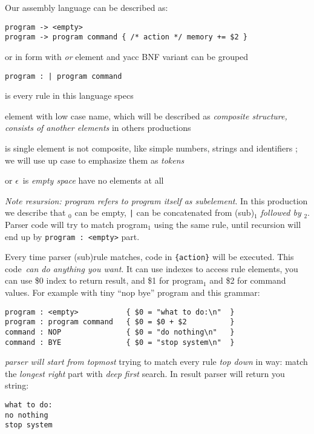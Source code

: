 \bigskip\noindent
Our assembly language can be described as:
\begin{lstlisting}
program -> <empty>
program -> program command { /* action */ memory += $2 }
\end{lstlisting}
or in form with \emph{or} element and yacc BNF variant can be grouped
\begin{lstlisting}
program : | program command
\end{lstlisting}

\begin{description}[nosep]
\item[\term{production}] is every rule in this language specs
\item[\term{nonterminal}] element with low case name, which will be
described as \emph{composite structure, consists of another elements} in others
productions
\item[\term{terminal}] is single element is not composite, like simple numbers,
strings and identifiers ; we will use up case to emphasize
them as \emph{tokens}
\item[\term{epsilon}] or $\epsilon$\ is \emph{empty space} have no elements
at all
\end{description}

\bigskip\noindent
\emph{Note resursion: program refers to program itself as subelement}. In this
production we describe that $_0$ can be empty,  \verb$|$
can be concatenated from (sub)$_1$ \emph{followed by}
$_2$. Parser code will  try to match program$_1$
using the same rule, until recursion will end up by \verb|program : <empty>|
part.

Every time parser (sub)rule matches, code in \verb|{action}| will be
executed. This code\ \emph{can do anything you want}. It can
use indexes to access rule elements, you can use \$0 index to return
result, and
\$1 for program${_1}$ and \$2 for command values. For example with tiny ``nop
bye'' program and this grammar:
\begin{lstlisting}
program : <empty>			{ $0 = "what to do:\n"	}
program : program command	{ $0 = $0 + $2			}
command : NOP				{ $0 = "do nothing\n"	}
command : BYE				{ $0 = "stop system\n"	}
\end{lstlisting}
\emph{parser will start from topmost}  trying to match every rule
\emph{top down} in  way: match the \emph{longest right} part with
\emph{deep first} search. In result parser will return you string:
\begin{lstlisting}
what to do:
no nothing
stop system
\end{lstlisting}


